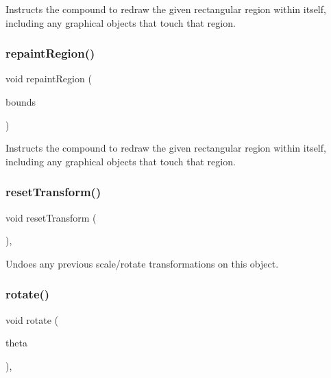 Instructs the compound to redraw the given rectangular region within itself, including any graphical objects that touch that region. 

\mbox{\label{classGCompound_a769c46fb3e1004aec76e8b0adfa42aa6}} 
\subsubsection{\texorpdfstring{repaint\+Region()}{repaintRegion()}\hspace{0.1cm}{\footnotesize\ttfamily [2/2]}}
{\footnotesize\ttfamily void repaint\+Region (\begin{DoxyParamCaption}\item[{const \mbox{\hyperlink{classGRectangle}{G\+Rectangle}} \&}]{bounds }\end{DoxyParamCaption})\hspace{0.3cm}{\ttfamily [virtual]}}



Instructs the compound to redraw the given rectangular region within itself, including any graphical objects that touch that region. 

\mbox{\label{classGObject_a6022a1fd1e5dcd2fd5585e5a36aa3f37}} 
\subsubsection{\texorpdfstring{reset\+Transform()}{resetTransform()}}
{\footnotesize\ttfamily void reset\+Transform (\begin{DoxyParamCaption}{ }\end{DoxyParamCaption})\hspace{0.3cm}{\ttfamily [virtual]}, {\ttfamily [inherited]}}



Undoes any previous scale/rotate transformations on this object. 

\mbox{\label{classGObject_ae1ffaa12185dfd5ba464f7d87c329e26}} 
\subsubsection{\texorpdfstring{rotate()}{rotate()}}
{\footnotesize\ttfamily void rotate (\begin{DoxyParamCaption}\item[{double}]{theta }\end{DoxyParamCaption})\hspace{0.3cm}{\ttfamily [virtual]}, {\ttfamily [inherited]}}




